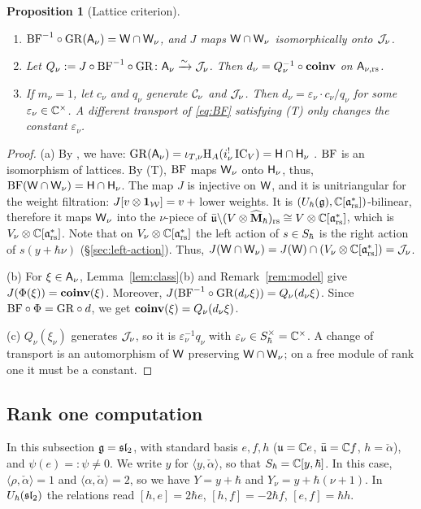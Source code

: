 \documentclass{article}
\theoremstyle{plain}
\newtheorem{proposition}[theorem]{Proposition}
\theoremstyle{definition}
\theoremstyle{remark}
\numberwithin{equation}{section}
\begin{document}
\begin{proposition}[Lattice criterion]\label{prop:lattice}
\begin{enumerate}[label=(\alph*)]
\item $\mathrm{BF}^{-1}\circ \mathrm{GR}(\mathsf A_\nu)=\mathsf W\cap\mathsf W_\nu$, and $J$ maps $\mathsf W\cap\mathsf W_\nu$ isomorphically onto $\mathcal J_\nu$.
\item Let $Q_\nu:=J\circ\mathrm{BF}^{-1}\circ\mathrm{GR}\colon\mathsf A_\nu\xrightarrow{\sim}\mathcal J_\nu$. Then $d_\nu=Q_\nu^{-1}\circ\operatorname{\mathbf{coinv}}$ on $\mathsf A_{\nu,\mathrm{rs}}$.
\item If $m_\nu=1$, let $c_\nu$ and $q_\nu$ generate $\mathcal C_\nu$ and $\mathcal J_\nu$. Then $d_\nu=\varepsilon_\nu\cdot c_\nu/q_\nu$ for some $\varepsilon_\nu\in\mathbb{C}^\times$. A different transport of \eqref{eq:BF} satisfying (T) only changes the constant $\varepsilon_\nu$.
\end{enumerate}
\end{proposition}

\begin{proof}
(a) By \cite[Theorem 1.4.1]{ginzburg2022differentialoperatorsgugelfandgraev}, we have: $\mathrm{GR}(\mathsf A_\nu)=\iota_{T,\nu}\mathrm{H}_A(i_\nu^!\operatorname{IC}_V)=\mathsf H\cap\mathsf H_\nu$ . $\mathrm{BF}$ is an isomorphism of lattices. By (T), $\mathrm{BF}$ maps $\mathsf W_\nu$ onto $\mathsf H_\nu$, thus, $\mathrm{BF}(\mathsf W\cap\mathsf W_\nu)=\mathsf H\cap\mathsf H_\nu$. The map $J$ is injective on $\mathsf W$, and it is unitriangular for the weight filtration: $J[v\otimes\mathbf 1_{\mathcal{W}}]=v+{}$lower weights. It is $(U_\hbar(\mathfrak{g}), \mathbb{C}[\mathfrak{a}^*_{\mathrm{rs}}])$-bilinear, therefore it maps $\mathsf W_\nu$ into the $\nu$-piece of $\bar{\mathfrak u}\backslash(V\otimes\widehat{\mathbf M}_\hbar)_{\mathrm{rs}}\cong V\otimes\mathbb{C}[\mathfrak{a}^*_{\mathrm{rs}}]$, which is $V_\nu\otimes\mathbb{C}[\mathfrak{a}^*_{\mathrm{rs}}]$. Note that on $V_\nu\otimes\mathbb{C}[\mathfrak{a}^*_{\mathrm{rs}}]$ the left action of $s\in S_\hbar$ is the right action of $s(y+\hbar\nu)$ (\S\ref{sec:left-action}). Thus, $J(\mathsf W\cap\mathsf W_\nu)=J(\mathsf W)\cap(V_\nu\otimes\mathbb{C}[\mathfrak{a}^*_{\mathrm{rs}}])=\mathcal J_\nu$.

(b) For $\xi\in\mathsf A_\nu$, Lemma~\ref{lem:class}(b) and Remark~\ref{rem:model} give $J(\Phi(\xi))=\operatorname{\mathbf{coinv}}(\xi)$. Moreover,  $J(\mathrm{BF}^{-1}\circ \mathrm{GR}(d_\nu\xi))=Q_\nu(d_\nu\xi)$. Since $\mathrm{BF}\circ\Phi=\mathrm{GR}\circ d$, we get $\operatorname{\mathbf{coinv}}(\xi)=Q_\nu(d_\nu\xi)$.

(c) $Q_\nu(\xi_\nu)$ generates $\mathcal J_\nu$, so it is $\varepsilon_\nu^{-1}q_\nu$ with $\varepsilon_\nu\in S_\hbar^\times=\mathbb{C}^\times$. A change of transport is an automorphism of $\mathsf W$ preserving $\mathsf W\cap\mathsf W_\nu$; on a free module of rank one it must be a constant.
\end{proof}

\subsection{Rank one computation}\label{sec:disc-rank-one}
In this subsection $\mathfrak{g}=\mathfrak{sl}_2$, with standard basis $e,f,h$ ($\mathfrak{u}=\mathbb{C} e$, $\bar{\mathfrak{u}}=\mathbb{C} f$, $h=\check\alpha$), and $\psi(e)=:\psi\neq0$. We write $y$ for $\langle y,\check\alpha\rangle$, so that $S_\hbar=\mathbb{C}[y,\hbar]$. In this case, $\langle\rho,\check\alpha\rangle=1$ and $\langle\alpha,\check\alpha\rangle=2$, so we have $Y=y+\hbar$ and $Y_\nu=y+\hbar(\nu+1)$. In $U_\hbar(\mathfrak{sl}_2)$ the relations read $[h,e]=2\hbar e$, $[h,f]=-2\hbar f$, $[e,f]=\hbar h$.
\end{document}
